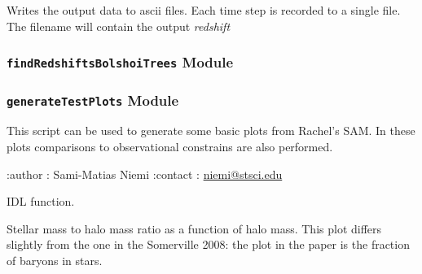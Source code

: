 \documentclass[letterpaper,10pt,english]{sphinxmanual}
\begin{document}
\begin{fulllineitems}
\label{SamPy.bolshoi:SamPy.bolshoi.collecthalomassesThreading.writeOutput}
Writes the output data to ascii files.
Each time step is recorded to a single file.
The filename will contain the output \emph{redshift}

\end{fulllineitems}



\subsubsection{\texttt{findRedshiftsBolshoiTrees} Module}
\label{SamPy.bolshoi:findredshiftsbolshoitrees-module}\label{SamPy.bolshoi:module-SamPy.bolshoi.findRedshiftsBolshoiTrees}

\subsubsection{\texttt{generateTestPlots} Module}
\label{SamPy.bolshoi:generatetestplots-module}\label{SamPy.bolshoi:module-SamPy.bolshoi.generateTestPlots}
This script can be used to generate some basic plots
from Rachel's SAM. In these plots comparisons to
observational constrains are also performed.

:author : Sami-Matias Niemi
:contact : \href{mailto:niemi@stsci.edu}{niemi@stsci.edu}


\begin{fulllineitems}
\label{SamPy.bolshoi:SamPy.bolshoi.generateTestPlots.fix}
IDL function.

\end{fulllineitems}



\begin{fulllineitems}
\label{SamPy.bolshoi:SamPy.bolshoi.generateTestPlots.fstar_plot}
Stellar mass to halo mass ratio as a function of halo mass.
This plot differs slightly from the one in the Somerville 2008:
the plot in the paper is the fraction of baryons in stars.

\end{fulllineitems}
\end{document}
